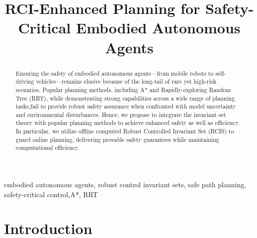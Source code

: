 \documentclass[conference]{IEEEtran}
\begin{document}
\title{RCI-Enhanced Planning for
Safety-Critical Embodied
Autonomous Agents
}

\author{
\and
{}
\and
{}
}


\maketitle

\begin{abstract}
Ensuring the safety of embodied autonomous agents—from mobile robots to self-driving vehicles—remains elusive because of the long-tail of rare yet high-risk scenarios. Popular planning methods, including A* and Rapidly-exploring Random Tree (RRT), while demonstrating strong capabilities across a wide range of planning tasks,fail to provide robust safety assurance when confronted with model uncertainty and environmental disturbances. Hence, we propose to integrate the invariant set theory with popular planning methods to achieve enhanced safety as well as efficiency. In particular, we utilize offline computed Robust Controlled Invariant Set (RCIS) to guard online planning, delivering provable safety guarantees while maintaining computational efficiency.


\end{abstract}

\begin{IEEEkeywords}
embodied autonomous agents, robust control invariant sets, safe path planning, safety-critical control,A*, RRT
\end{IEEEkeywords}

\section{Introduction}
\label{sec:intro}
\end{document}
